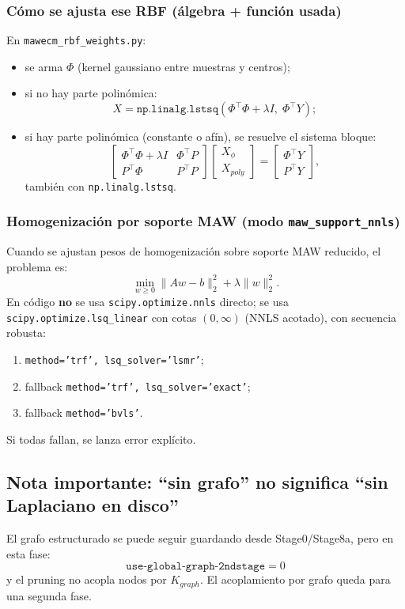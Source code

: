 \documentclass[11pt,a4paper]{article}
\begin{document}
\subsubsection*{Cómo se ajusta ese RBF (álgebra + función usada)}
En \texttt{mawecm\_rbf\_weights.py}:
\begin{itemize}[leftmargin=1.5em]
\item se arma $\Phi$ (kernel gaussiano entre muestras y centros);
\item si no hay parte polinómica:
\[
X=\texttt{np.linalg.lstsq}\!\left(\Phi^\top\Phi+\lambda I,\;\Phi^\top Y\right);
\]
\item si hay parte polinómica (constante o afín), se resuelve el sistema bloque:
\[
\begin{bmatrix}
\Phi^\top\Phi+\lambda I & \Phi^\top P\\
P^\top\Phi & P^\top P
\end{bmatrix}
\begin{bmatrix}
X_{\phi}\\ X_{poly}
\end{bmatrix}
=
\begin{bmatrix}
\Phi^\top Y\\ P^\top Y
\end{bmatrix},
\]
también con \texttt{np.linalg.lstsq}.
\end{itemize}

\subsubsection*{Homogenización por soporte MAW (modo \texttt{maw\_support\_nnls})}
Cuando se ajustan pesos de homogenización sobre soporte MAW reducido, el problema es:
\[
\min_{w\ge 0}\|Aw-b\|_2^2+\lambda\|w\|_2^2.
\]
En código \textbf{no} se usa \texttt{scipy.optimize.nnls} directo; se usa
\texttt{scipy.optimize.lsq\_linear} con cotas $(0,\infty)$ (NNLS acotado), con secuencia robusta:
\begin{enumerate}[leftmargin=1.5em]
\item \texttt{method='trf', lsq\_solver='lsmr'};
\item fallback \texttt{method='trf', lsq\_solver='exact'};
\item fallback \texttt{method='bvls'}.
\end{enumerate}
Si todas fallan, se lanza error explícito.

\subsection{Nota importante: ``sin grafo'' no significa ``sin Laplaciano en disco''}
El grafo estructurado se puede seguir guardando desde Stage0/Stage8a, pero en esta fase:
\[
\texttt{use-global-graph-2ndstage}=0
\]
y el pruning no acopla nodos por $K_{graph}$.
El acoplamiento por grafo queda para una segunda fase.
\end{document}
